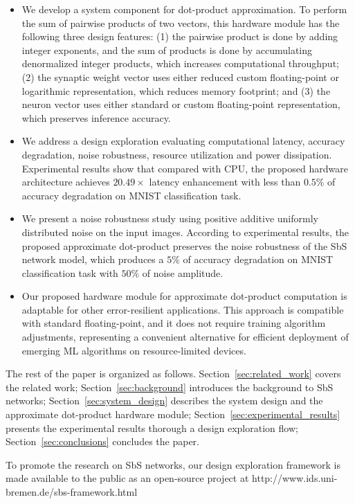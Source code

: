 \begin{itemize}
	\item We develop a system component for dot-product approximation. To perform the sum of pairwise products of two vectors, this hardware module has the following three design features: (1) the pairwise product is done by adding integer exponents, and the sum of products is done by accumulating denormalized integer products, which increases computational throughput; (2) the synaptic weight vector uses either reduced custom floating-point or logarithmic representation, which reduces memory footprint; and (3) the neuron vector uses either standard or custom floating-point representation, which preserves inference accuracy.
	\item We address a design exploration evaluating computational latency, accuracy degradation, noise robustness, resource utilization and power dissipation. Experimental results show that compared with CPU, the proposed hardware architecture achieves $20.49\times$ latency enhancement with less than $0.5\%$ of accuracy degradation on MNIST classification task.
	\item We present a noise robustness study using positive additive uniformly distributed noise on the input images. According to experimental results, the proposed approximate dot-product preserves the noise robustness of the SbS network model, which produces a $5\%$ of accuracy degradation on MNIST classification task with $50\%$ of noise amplitude.
	\item Our proposed hardware module for approximate dot-product computation is adaptable for other error-resilient applications. This approach is compatible with standard floating-point, and it does not require training algorithm adjustments, representing a convenient alternative for efficient deployment of emerging ML algorithms on resource-limited devices.
\end{itemize}


The rest of the paper is organized as follows. Section~\ref{sec:related_work} covers the related work; Section~\ref{sec:background} introduces the background to SbS networks; Section~\ref{sec:system_design} describes the system design and the approximate dot-product hardware module; Section~\ref{sec:experimental_results} presents the experimental results thorough a design exploration flow; Section~\ref{sec:conclusions} concludes the paper.


To promote the research on SbS networks, our design exploration framework is made available to the public as an open-source project at http://www.ids.uni-bremen.de/sbs-framework.html

